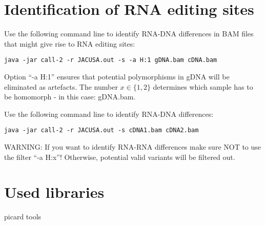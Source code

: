 \documentclass[10pt, a4paper]{article}
\begin{document}
\section{Identification of RNA editing sites}
Use the following command line to identify RNA-DNA differences in BAM files that might give rise to RNA editing sites:
\begin{verbatim}
java -jar call-2 -r JACUSA.out -s -a H:1 gDNA.bam cDNA.bam
\end{verbatim}
Option ``-a H:1'' ensures that potential polymorphisms in gDNA will be eliminated as artefacts. The number $x \in \{1, 2\}$
determines which sample has to be homomorph - in this case: gDNA.bam.

Use the following command line to identify RNA-DNA differences:
\begin{verbatim}
java -jar call-2 -r JACUSA.out -s cDNA1.bam cDNA2.bam
\end{verbatim}
WARNING: If you want to identify RNA-RNA differences make sure NOT to use the filter ``-a H:x''! Otherwise, potential valid variants will be filtered out. 

\section{Used libraries}
picard tools
\end{document}
